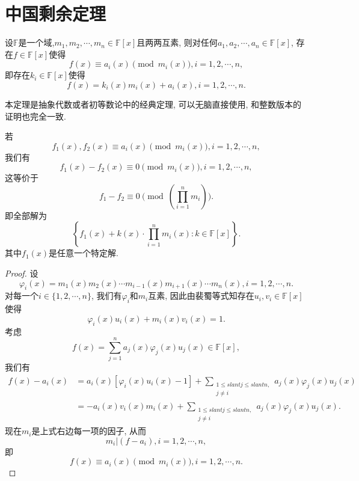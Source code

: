 \documentclass[../../main.tex]{subfiles}
\begin{document}
\section{中国剩余定理}

\begin{theorem}[中国剩余定理]\label{theorem:中国剩余定理(多项式版)}
设$\mathbb{F}$是一个域,$m_1,m_2,\cdots,m_n\in\mathbb{F}[x]$且两两互素, 则对任何$a_1,a_2,\cdots,a_n\in\mathbb{F}[x]$, 存在$f\in\mathbb{F}[x]$使得
$$
f(x)\equiv a_i(x)\pmod{m_i(x)},i=1,2,\cdots,n,
$$
即存在$k_i\in\mathbb{F}[x]$使得
$$
f(x)=k_i(x)m_i(x)+a_i(x),i=1,2,\cdots,n.
$$
\end{theorem}
\begin{note}
本定理是抽象代数或者初等数论中的经典定理, 可以无脑直接使用, 和整数版本的证明也完全一致.
\end{note}
\begin{remark}
若
$$
f_1(x),f_2(x)\equiv a_i(x)\pmod{m_i(x)},i=1,2,\cdots,n,
$$
我们有
$$
f_1(x)-f_2(x)\equiv0\pmod{m_i(x)},i=1,2,\cdots,n,
$$
这等价于
$$
f_1-f_2\equiv0\pmod{\left(\prod_{i=1}^{n}m_i\right)}.
$$
即全部解为
$$
\left\{f_1(x)+k(x)\cdot\prod_{i=1}^{n}m_i(x):k\in\mathbb{F}[x]\right\}.
$$
其中$f_1(x)$是任意一个特定解.
\end{remark}
\begin{proof}
设
$$
\varphi_i(x)=m_1(x)m_2(x)\cdots m_{i-1}(x)m_{i+1}(x)\cdots m_n(x),i=1,2,\cdots,n.
$$
对每一个$i\in\{1,2,\cdots,n\}$, 我们有$\varphi_i$和$m_i$互素, 因此由裴蜀等式知存在$u_i,v_i\in\mathbb{F}[x]$使得
$$
\varphi_i(x)u_i(x)+m_i(x)v_i(x)=1.
$$
考虑
$$
f(x)=\sum_{j=1}^{n}a_j(x)\varphi_j(x)u_j(x)\in\mathbb{F}[x],
$$
我们有
$$
\begin{aligned}
f(x)-a_i(x)&=a_i(x)\left[\varphi_i(x)u_i(x)-1\right]+\sum_{\substack{1\leqslant slant j\leqslant slant n,\\j\neq i}}a_j(x)\varphi_j(x)u_j(x)\\
&=-a_i(x)v_i(x)m_i(x)+\sum_{\substack{1\leqslant slant j\leqslant slant n,\\j\neq i}}a_j(x)\varphi_j(x)u_j(x).
\end{aligned}
$$
现在$m_i$是上式右边每一项的因子, 从而
$$
m_i|(f-a_i),i=1,2,\cdots,n,
$$
即
$$
f(x)\equiv a_i(x)\pmod{m_i(x)},i=1,2,\cdots,n.
$$
\end{proof}
\end{document}

